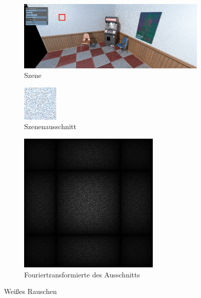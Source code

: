 \begin{figure}[H]
    \begin{subfigure}{\textwidth}
        \centering \includegraphics[scale=.2]{content/TemporalerAlg/Bilder/white_noise.png}
        \caption{Szene}
        \label{fig:Szene_Weißes Rauschen}
    \end{subfigure}
    \begin{subfigure}{0.5\textwidth}
        \centering \includegraphics[width=0.5\linewidth]{content/TemporalerAlg/Bilder/white_noise_64x64.jpg} 
        \caption{Szenenausschnitt}
        \label{fig:ausschnitt_Weißes_Rauschen}
    \end{subfigure}
    \begin{subfigure}{0.5\textwidth}
        \centering \includegraphics[width=0.5\linewidth]{content/TemporalerAlg/Bilder/white_noise_64x64_fourier.png}
        \caption{Fouriertransformierte des Ausschnitts}
        \label{fig:Fouriertransformierte_Weißes_Rauschen}
    \end{subfigure}
        \caption{Weißes Rauschen}
        \label{fig:Path Tracer mit zufälligen Seeds}
\end{figure}



